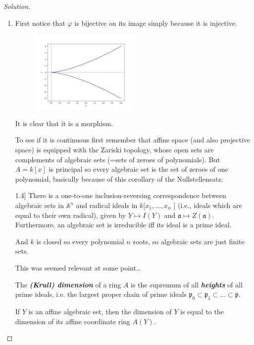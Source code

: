 \begin{proof}[Solution]\leavevmode
	\begin{enumerate}[label=\alph*.]
		\item First notice that $\varphi$ is bijective on its image simply because it is injective.
			\begin{figure}[H]
				\centering
				\includegraphics[width=0.5\textwidth]{fig1.png}
			\end{figure}
			
			It is clear that it is a morphism.

			To see if it is continuous first remember that affine space (and also projective space) is equipped with the Zariski topology, whose open sets are complements of algebraic sets (=sets of zeroes of polynomials). But $A=k[x]$ is principal so every algebraic set is the set of zeroes of one polynomial, basically because of this corollary of the Nullstellensatz:
\begin{coro}[[Hart] 1.4]
	There is a one-to-one inclusion-reversing correspondence between algebraic sets in $\mathbb{A}^{n} $ and radical ideals in $k[x_1,\ldots,x_n$ ] (i.e., ideals which are equal to their own radical), given by $Y\mapsto I(Y)$ and $\mathfrak{a}\mapsto Z(\mathfrak{a})$. Furthermore, an algebraic set is irreducible iff its ideal is a prime ideal.
\end{coro}

And $k$ is closed so every polynomial $n$ roots, so algebraic sets are just finite sets.

{\color{magenta}This was seemed relevant at some point…}

\begin{defn}
	The \textit{\textbf{(Krull) dimension}} of a ring $A$ is the supremum of all \textit{\textbf{heights}} of all prime ideals, i.e. the largest proper chain of prime ideals $\mathfrak{p}_0\subset \mathfrak{p}_1\subset\ldots\subset \mathfrak{p}$.
\end{defn}

\begin{prop}[1.7]
	If $Y$ is an affine algebraic set, then the dimension of $Y$ is equal to the dimension of its affine coordinate ring $A(Y)$.
\end{prop}


\end{enumerate}
\end{proof}
